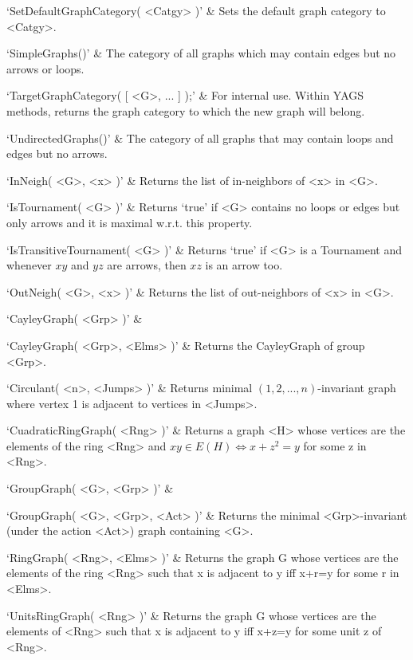 `SetDefaultGraphCategory( <Catgy> )' & 
Sets  the default graph category to <Catgy>.

`SimpleGraphs()' & 
The category of all graphs which may contain edges but no arrows or loops. 

`TargetGraphCategory( [ <G>, ... ] );' & 
For internal use. Within YAGS methods, returns the graph category to which the new graph will belong.

`UndirectedGraphs()' & 
The category of all graphs that may contain loops and edges but no arrows.
\enditems


\beginitems
`InNeigh( <G>, <x> )' & 
Returns the list of in-neighbors of <x> in <G>.

`IsTournament( <G> )' & 
Returns `true' if <G> contains no loops or edges but only arrows and it is maximal w.r.t. this property.

`IsTransitiveTournament( <G> )' & 
Returns `true' if <G> is a Tournament and whenever $xy$ and $yz$ are arrows, then $xz$ is an arrow too.

`OutNeigh( <G>, <x> )' & 
Returns the list of out-neighbors of <x> in <G>.
\enditems


\beginitems
`CayleyGraph( <Grp> )' & 

`CayleyGraph( <Grp>, <Elms> )' & 
Returns the CayleyGraph of group <Grp>.

`Circulant( <n>, <Jumps> )' & 
Returns minimal $(1, 2, ..., n)$-invariant graph where vertex 1 is adjacent to vertices in <Jumps>.

`CuadraticRingGraph( <Rng> )' & 
Returns a graph <H> whose vertices are the elements of the ring <Rng> and $xy\in E(H) \iff x+z^2=y$ for some z in <Rng>.

`GroupGraph( <G>, <Grp> )' & 

`GroupGraph( <G>, <Grp>, <Act> )' & 
Returns the minimal <Grp>-invariant (under the action <Act>) graph containing <G>.

`RingGraph( <Rng>, <Elms> )' & 
Returns  the  graph  G  whose  vertices are the elements of the ring <Rng>
such that x is adjacent to y iff x+r=y for some r in <Elms>.

`UnitsRingGraph( <Rng> )' & 
Returns  the graph G whose vertices are the elements of <Rng>  such that x
is adjacent to y iff x+z=y for some unit z of <Rng>.
\enditems



